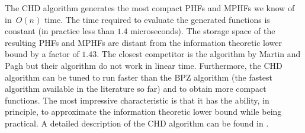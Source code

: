 The CHD algorithm generates the most compact PHFs and MPHFs we know of in~$O(n)$ time.
The time required to evaluate the generated functions is constant (in practice less than $1.4$ microseconds).
The storage space of the resulting PHFs and MPHFs are distant from the information
theoretic lower bound by a factor of $1.43$.
The closest competitor is the algorithm by Martin and Pagh \cite{dp08} but
their algorithm do not work in linear time.
Furthermore, the CHD algorithm
can be tuned to run faster than the BPZ algorithm \cite{bpz07} (the fastest algorithm
available in the literature so far) and to obtain more compact functions.
The most impressive characteristic is that it has the ability, in principle, to
approximate the information theoretic lower bound while being practical.
A detailed description of the CHD algorithm can be found in \cite{bbd09}.
